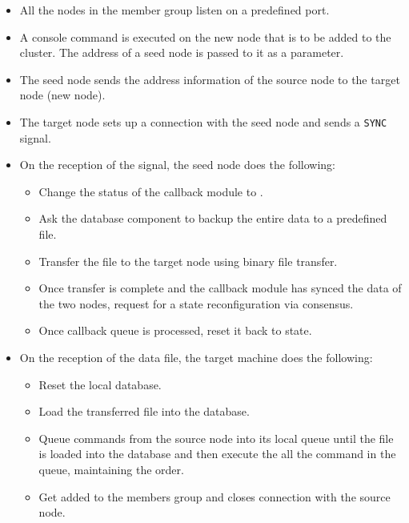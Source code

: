 \begin{itemize}
  \item All the nodes in the member group listen on a predefined port.
  \item A console command is executed on the new node that is to be added to the
    cluster. The address of a seed node%
     is passed to it as a parameter.
  \item The seed node sends the address information of the source node%
     to the target node (new node).
  \item The target node sets up a  connection with the seed node and
    sends a \texttt{SYNC}%
     signal.
  \item On the reception of the signal, the seed node does the following:
    \begin{itemize}
      \item Change the status of the callback module to .
      \item Ask the database component to backup the entire data to a
        predefined file.
      \item Transfer the file to the target node using binary file transfer.
      \item Once transfer is complete and the callback module has synced
        the data of the two nodes, request for a state reconfiguration via
        consensus.
      \item Once callback queue is processed, reset it back to 
        state.
    \end{itemize}
  \item On the reception of the data file, the target machine does the
    following:
    \begin{itemize}
      \item Reset the local database.
      \item Load the transferred file into the database.
      \item Queue commands from the source node into its local
        queue until the file is loaded into the database and then execute
        the all the command in the queue, maintaining the order.
      \item Get added to the members group and closes connection with the
        source node.
    \end{itemize}
\end{itemize}

